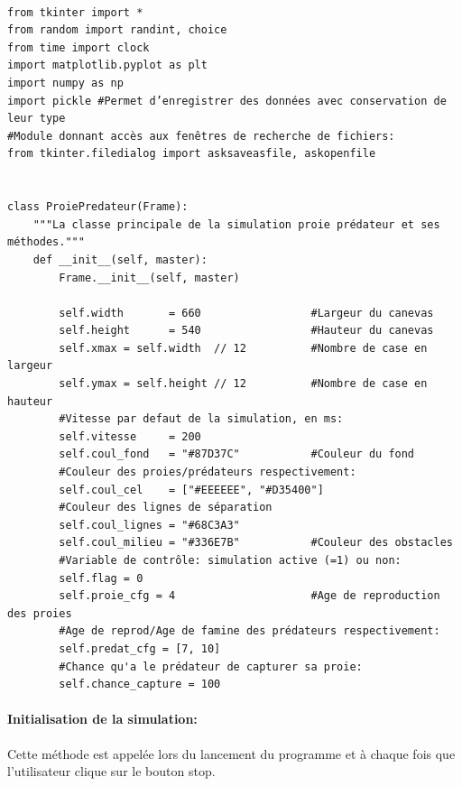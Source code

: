 \documentclass[11pt]{article}
\begin{document}
\begin{verbatim}

from tkinter import *
from random import randint, choice
from time import clock
import matplotlib.pyplot as plt
import numpy as np
import pickle #Permet d’enregistrer des données avec conservation de leur type
#Module donnant accès aux fenêtres de recherche de fichiers:
from tkinter.filedialog import asksaveasfile, askopenfile


class ProiePredateur(Frame):
    """La classe principale de la simulation proie prédateur et ses méthodes."""
    def __init__(self, master):
        Frame.__init__(self, master)

        self.width       = 660                 #Largeur du canevas
        self.height      = 540                 #Hauteur du canevas
        self.xmax = self.width  // 12          #Nombre de case en largeur
        self.ymax = self.height // 12          #Nombre de case en hauteur 
        #Vitesse par defaut de la simulation, en ms:
        self.vitesse     = 200                     
        self.coul_fond   = "#87D37C"           #Couleur du fond
        #Couleur des proies/prédateurs respectivement:
        self.coul_cel    = ["#EEEEEE", "#D35400"] 
        #Couleur des lignes de séparation  
        self.coul_lignes = "#68C3A3"                
        self.coul_milieu = "#336E7B"           #Couleur des obstacles
        #Variable de contrôle: simulation active (=1) ou non:
        self.flag = 0                               
        self.proie_cfg = 4                     #Age de reproduction des proies
        #Age de reprod/Age de famine des prédateurs respectivement:
        self.predat_cfg = [7, 10]    
        #Chance qu'a le prédateur de capturer sa proie:
        self.chance_capture = 100 

\end{verbatim}

\paragraph{Initialisation de la simulation:}
Cette méthode est appelée lors du lancement du programme et à chaque fois que l'utilisateur clique sur le bouton stop.
\end{document}
